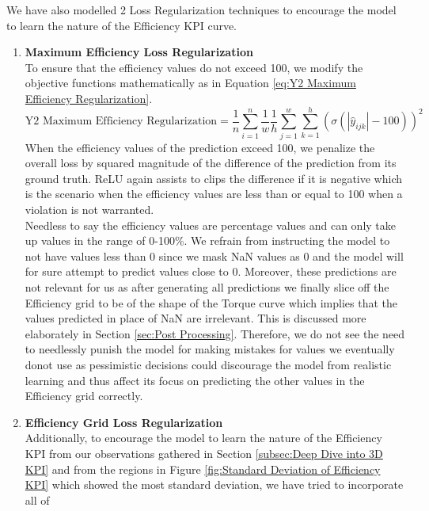 \documentclass{report} %
\begin{document}
We have also modelled 2 Loss Regularization techniques to encourage the model to learn the nature of the Efficiency \ac{KPI} curve.
\begin{enumerate}
\item \textbf{Maximum Efficiency Loss Regularization} \\
To ensure that the efficiency values do not exceed 100, we modify the objective functions mathematically as in Equation \ref{eq:Y2 Maximum Efficiency Regularization}.
\begin{equation}
\text{Y2 Maximum Efficiency Regularization} = \frac{1}{n} \sum_{i=1}^{n}\frac{1}{w} \frac{1}{h} \sum_{j=1}^{w} \sum_{k=1}^{h}\left(\sigma(|\hat{y}_{ijk}| - 100)\right)^2 
\label{eq:Y2 Maximum Efficiency Regularization}
\end{equation} 
\vspace{0.2cm} %
When the efficiency values of the prediction exceed 100, we penalize the overall loss by squared magnitude of the difference of the prediction from its ground truth.
\ac{ReLU} again assists to clips the difference if it is negative which is the scenario when the efficiency values are less than or equal to 100 when a violation is not warranted. \\
Needless to say the efficiency values are percentage values and can only take up values in the range of 0-100\%.
We refrain from instructing the model to not have values less than 0 since we mask \ac{NaN} values as 0 and the model will for sure attempt to predict values close to 0.
Moreover, these predictions are not relevant for us as after generating all predictions we finally slice off the Efficiency grid to be of the shape of the Torque curve 
which implies that the values predicted in place of \ac{NaN} are irrelevant. This is discussed more elaborately in Section \ref{sec:Post Processing}.
Therefore, we do not see the need to needlessly punish the model for making mistakes for values we eventually donot use as pessimistic decisions could discourage the model 
from realistic learning and thus affect its focus on predicting the other values in the Efficiency grid correctly.
\item \textbf{Efficiency Grid Loss Regularization} \\
Additionally, to encourage the model to learn the nature of the Efficiency \ac{KPI} from our observations gathered in Section \ref{subsec:Deep Dive into 3D KPI} and from 
the regions in Figure \ref{fig:Standard Deviation of Efficiency KPI} which showed the most standard deviation, we have tried to incorporate all of 

\end{enumerate}
\end{document}

